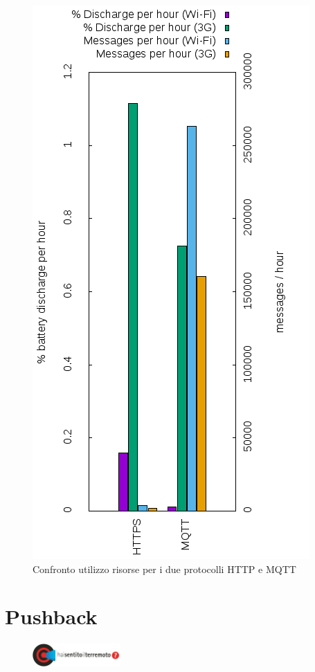 \documentclass[a4paper,10pt]{memoir}
\begin{document}
\begin{figure}[ht]
\centering
\caption{Confronto utilizzo risorse per i due protocolli HTTP e MQTT}
\label{fig:networkperformance}
\includegraphics[scale=0.8]{database/networkperformance}
\end{figure}

\pagebreak

\section{Pushback}

\begin{figure}
\includegraphics[width=0.30\textwidth]{app/hsit}
\end{figure}
\end{document}
